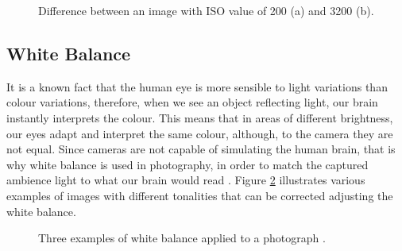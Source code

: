\begin{figure}[htbp]
        \centering
  \caption{Difference between an image with ISO value of 200 (a) and 3200 (b).}
  \label{fig:iso_example}
\end{figure}

\subsection{White Balance}
\label{sub:white_balance}

It is a known fact that the human eye is more sensible to light variations than colour variations, therefore, when we see an object reflecting light, our brain instantly interprets the colour. This means that in areas of different brightness, our eyes adapt and interpret the same colour, although, to the camera they are not equal.
Since cameras are not capable of simulating the human brain, that is why white balance is used in photography, in order to match the captured ambience light to what our brain would read \cite{kamps2012rules}. Figure \ref{fig:white_balance_example} illustrates various examples of images with different tonalities that can be corrected adjusting the white balance.

\begin{figure}[htbp]
        \centering
  \caption{Three examples of white balance applied to a photograph \cite{kamps2012rules}.}
  \label{fig:white_balance_example}
\end{figure}





